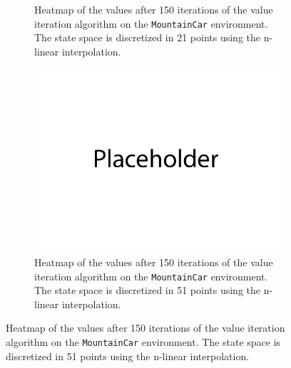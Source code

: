 \documentclass{article}
\begin{document}
\begin{enumerate}[(a)]
\begin{figure}[h!]
\begin{subfigure}{0.3\textwidth}
\caption{Heatmap of the values after 150 iterations of the value iteration algorithm on the \texttt{MountainCar} environment. 
                The state space is discretized in 21 points using the n-linear interpolation.}
    \end{subfigure}
    \hspace{0.1 in}
    \begin{subfigure}{0.3\textwidth}
        \centering
        \includegraphics[width=\textwidth]{figures/placeholder.png}
\caption{Heatmap of the values after 150 iterations of the value iteration algorithm on the \texttt{MountainCar} environment. 
                The state space is discretized in 51 points using the n-linear interpolation.}
                

\end{subfigure}
\end{figure}
\end{enumerate}
\end{document}
